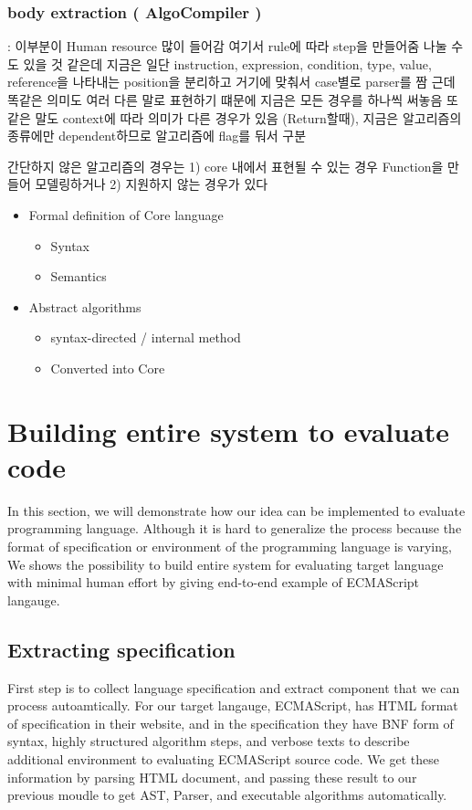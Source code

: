 \subsubsection{body extraction ( AlgoCompiler )} : 이부분이 Human resource 많이 들어감
여기서 rule에 따라 step을 만들어줌
나눌 수도 있을 것 같은데 지금은 일단 instruction, expression, condition, type, value, reference을 나타내는 position을 분리하고 거기에 맞춰서 case별로 parser를 짬
근데 똑같은 의미도 여러 다른 말로 표현하기 떄문에 지금은 모든 경우를 하나씩 써놓음
또 같은 말도 context에 따라 의미가 다른 경우가 있음 (Return할때), 지금은 알고리즘의 종류에만 dependent하므로 알고리즘에 flag를 둬서 구분

간단하지 않은 알고리즘의 경우는 1) core 내에서 표현될 수 있는 경우 Function을 만들어 모델링하거나 
2) 지원하지 않는 경우가 있다


\begin{itemize}
  \item Formal definition of Core language
    \begin{itemize}
      \item Syntax
      \item Semantics
    \end{itemize}
  \item Abstract algorithms
    \begin{itemize}
      \item syntax-directed / internal method
      \item Converted into Core
    \end{itemize}
\end{itemize}

\section{ Building entire system to evaluate code }

In this section, we will demonstrate how our idea can be implemented to evaluate programming language. Although it is hard to generalize the process because the format of specification or 
environment of the programming language is varying, We shows the possibility to build entire system for evaluating target language with minimal human effort by giving end-to-end example of ECMAScript langauge.

\subsection{Extracting specification}
First step is to collect language specification and extract component that we can process autoamtically. For our target langauge, ECMAScript, has HTML format of specification in their website, and
in the specification they have BNF form of syntax, highly structured algorithm steps, and verbose texts to describe additional environment to evaluating ECMAScript source code.
We get these information by parsing HTML document, and passing these result to our previous moudle to get AST, Parser, and executable algorithms automatically.

